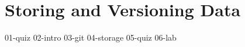\chapter{Storing and Versioning Data}

{01-quiz}
{02-intro}
{03-git}
{04-storage}
{05-quiz}
{06-lab}


